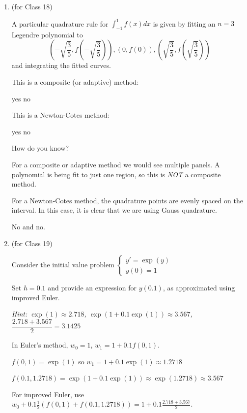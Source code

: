 \documentclass[12pt,letterpaper,answers]{exam}
\begin{document}
\begin{enumerate}
\item (for Class 18)

A particular quadrature rule for $\displaystyle\int_{-1}^1f(x)dx$ is given by fitting an $n=3$ Legendre polynomial to 
$$\left(-\sqrt{\frac{3}{5}},f\left(-\sqrt{\frac{3}{5}}\right)\right), \left(0,f\left(0\right)\right), \left(\sqrt{\frac{3}{5}},f\left(\sqrt{\frac{3}{5}}\right)\right)$$
and integrating the fitted curves.

This is a composite (or adaptive) method:
\begin{oneparchoices}
\choice yes \choice no
\end{oneparchoices}

This is a Newton-Cotes method:
\begin{oneparchoices}
\choice yes \choice no
\end{oneparchoices}

How do you know?

\begin{solution}
For a composite or adaptive method we would see multiple panels.  A polynomial is being fit to just one region, so this is \textit{NOT} a composite method. 

For a Newton-Cotes method, the quadrature points are evenly spaced on the interval. In this case, it is clear that we are using Gauss quadrature.

No and no.
\end{solution}


\item (for Class 19)

Consider the initial value problem $\left\{\begin{array}{l}
y' = \exp(y) \\
y(0) = 1
\end{array}
\right.$

Set $h = 0.1$ and provide an expression for $y(0.1)$, as approximated using improved Euler.

\emph{Hint: $\exp(1)\approx2.718$, $\exp(1+0.1\exp(1))\approx3.567$, $\dfrac{2.718+3.567}{2}=3.1425$}

\begin{solution}
In Euler's method, $w_0 = 1$, $w_1 = 1 + 0.1f(0,1)$.

$f(0,1) = \exp(1)$ so $w_1 = 1+0.1\exp(1) \approx 1.2718$

$f(0.1,1.2718) = \exp(1+0.1\exp(1)) \approx \exp(1.2718) \approx 3.567$

For improved Euler, use $w_0 + 0.1 \frac{1}{2}(f(0,1) +f(0.1,1.2718)) = 1+0.1\frac{2.718+3.567}{2}$.


\end{solution}
\end{enumerate}
\end{document}
